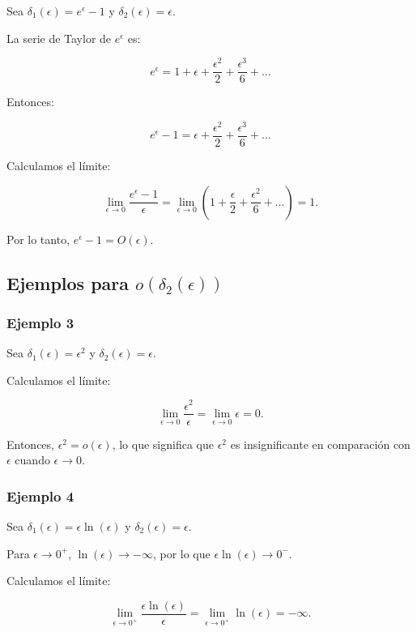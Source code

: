 \documentclass[12pt, a4paper]{report}
\begin{document}
Sea \(\delta_1(\epsilon) = e^\epsilon - 1\) y \(\delta_2(\epsilon) = \epsilon\).

La serie de Taylor de \(e^\epsilon\) es:

\[
e^\epsilon = 1 + \epsilon + \frac{\epsilon^2}{2} + \frac{\epsilon^3}{6} + \dots
\]

Entonces:

\[
e^\epsilon - 1 = \epsilon + \frac{\epsilon^2}{2} + \frac{\epsilon^3}{6} + \dots
\]

Calculamos el límite:

\[
\lim_{\epsilon \to 0} \frac{e^\epsilon - 1}{\epsilon} = \lim_{\epsilon \to 0} \left(1 + \frac{\epsilon}{2} + \frac{\epsilon^2}{6} + \dots \right) = 1.
\]

Por lo tanto, \(e^\epsilon - 1 = O\left( \epsilon \right)\).

\subsection*{Ejemplos para \( o\left( \delta_2(\epsilon) \right) \)}

\subsubsection*{Ejemplo 3}

Sea \(\delta_1(\epsilon) = \epsilon^2\) y \(\delta_2(\epsilon) = \epsilon\).

Calculamos el límite:

\[
\lim_{\epsilon \to 0} \frac{\epsilon^2}{\epsilon} = \lim_{\epsilon \to 0} \epsilon = 0.
\]

Entonces, \(\epsilon^2 = o\left( \epsilon \right)\), lo que significa que \(\epsilon^2\) es insignificante en comparación con \(\epsilon\) cuando \(\epsilon \to 0\).

\subsubsection*{Ejemplo 4}

Sea \(\delta_1(\epsilon) = \epsilon \ln(\epsilon)\) y \(\delta_2(\epsilon) = \epsilon\).

Para \(\epsilon \to 0^+\), \(\ln(\epsilon) \to -\infty\), por lo que \(\epsilon \ln(\epsilon) \to 0^-\).

Calculamos el límite:

\[
\lim_{\epsilon \to 0^+} \frac{\epsilon \ln(\epsilon)}{\epsilon} = \lim_{\epsilon \to 0^+} \ln(\epsilon) = -\infty.
\]
\end{document}

